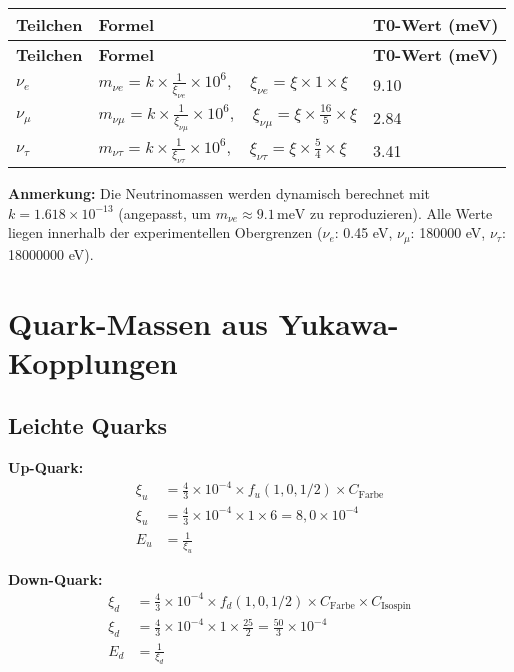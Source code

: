 \documentclass[12pt,a4paper]{article}
\begin{document}
	\begin{longtable}{|p{3cm}|p{4cm}|p{3cm}|}
		\hline
		\textbf{Teilchen} & \textbf{Formel} & \textbf{T0-Wert (meV)} \\
		\hline
		\endfirsthead
		\hline
		\textbf{Teilchen} & \textbf{Formel} & \textbf{T0-Wert (meV)} \\
		\hline
		\endhead
		\(\nu_e\) & \(m_{\nu e} = k \times \frac{1}{\xi_{\nu e}} \times 10^6, \quad \xi_{\nu e} = \xi \times 1 \times \xi\) & 9.10 \\
		\hline
		\(\nu_{\mu}\) & \(m_{\nu \mu} = k \times \frac{1}{\xi_{\nu \mu}} \times 10^6, \quad \xi_{\nu \mu} = \xi \times \frac{16}{5} \times \xi\) & 2.84 \\
		\hline
		\(\nu_{\tau}\) & \(m_{\nu \tau} = k \times \frac{1}{\xi_{\nu \tau}} \times 10^6, \quad \xi_{\nu \tau} = \xi \times \frac{5}{4} \times \xi\) & 3.41 \\
		\hline
	\end{longtable}
	
	\textbf{Anmerkung:} Die Neutrinomassen werden dynamisch berechnet mit \( k = 1.618 \times 10^{-13} \) (angepasst, um \( m_{\nu e} \approx 9.1 \, \text{meV} \) zu reproduzieren). Alle Werte liegen innerhalb der experimentellen Obergrenzen (\(\nu_e\): 0.45 eV, \(\nu_\mu\): 180000 eV, \(\nu_\tau\): 18000000 eV).
	
	\section{Quark-Massen aus Yukawa-Kopplungen}
	
	\subsection{Leichte Quarks}
	
	\textbf{Up-Quark:}
	\begin{align}
		\xi_u &= \frac{4}{3} \times 10^{-4} \times f_u(1,0,1/2) \times C_{\text{Farbe}} \\
		\xi_u &= \frac{4}{3} \times 10^{-4} \times 1 \times 6 = 8,0 \times 10^{-4} \\
		E_u &= \frac{1}{\xi_u}
	\end{align}
	
	\textbf{Down-Quark:}
	\begin{align}
		\xi_d &= \frac{4}{3} \times 10^{-4} \times f_d(1,0,1/2) \times C_{\text{Farbe}} \times C_{\text{Isospin}} \\
		\xi_d &= \frac{4}{3} \times 10^{-4} \times 1 \times \frac{25}{2} = \frac{50}{3} \times 10^{-4} \\
		E_d &= \frac{1}{\xi_d}
	\end{align}
	
\end{document}
